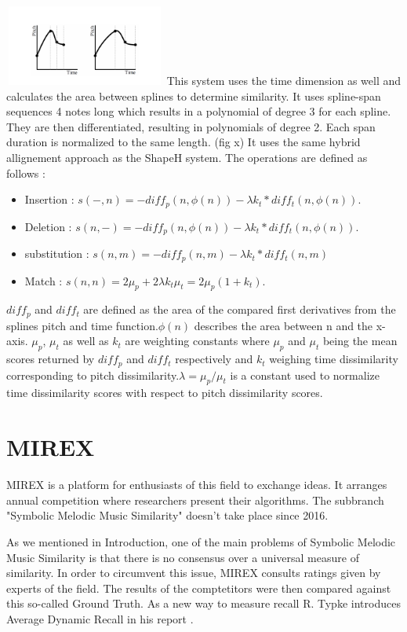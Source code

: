 \documentclass{llncs}
\begin{document}
		  \includegraphics[width=200px,height=100px,keepaspectratio]{two_of_five_point_one}
        This system uses the time dimension as well and calculates the area between splines to determine similarity. It uses spline-span sequences 4 notes long which results in a polynomial of degree 3 for each spline. They are then differentiated, resulting in polynomials of degree 2. Each span duration is normalized to the same length. (fig x)
        It uses the same hybrid allignement approach as the ShapeH system. 
		The operations are defined as follows : 
        \begin{itemize}
         \item Insertion : 
        $ s(-,n) = -diff _p(n, \phi(n)) - \lambda k_t * diff_t(n, \phi(n)).$
        \item Deletion : 
         $s(n,-) = -diff_p(n, \phi(n)) - \lambda k_t * diff_t (n, \phi(n)).$
       \item substitution : 
       $s(n,m) = - diff_p (n,m) - \lambda k_t * diff_t (n,m) $
       \item Match : 
        $s(n,n) = 2\mu_p + 2\lambda k_t \mu_t = 2\mu_p (1+k_t).$
        \end{itemize}
        
        $diff_p$ and $diff_t$ are defined as the area of the compared first derivatives from the splines pitch and time function.$ \phi(n)$ describes the area between n and the x-axis. $\mu_p$, $\mu_t$ as well as $k_t$ are weighting constants where $\mu_p$ and $\mu_t$ being the mean scores returned by $diff_p$ and $diff_t$ respectively and $k_t$ weighing time dissimilarity corresponding to pitch dissimilarity.$ \lambda = \mu_p / \mu_t$ is a constant used to normalize time dissimilarity scores with respect to pitch dissimilarity scores.
	\section{MIREX}
		MIREX is a platform for enthusiasts of this field to exchange ideas. It arranges annual competition where researchers present their algorithms. The subbranch "Symbolic Melodic Music Similarity" doesn't take place since 2016. 


		As we mentioned in Introduction, one of the main problems of Symbolic Melodic Music Similarity is that there is no consensus over a universal measure of similarity. In order to circumvent this issue, MIREX consults ratings given by experts of the field. The results of the comptetitors were then compared against this so-called Ground Truth. As a new way to measure recall R. Typke introduces Average Dynamic Recall in his report \cite{three}.       
\end{document}
